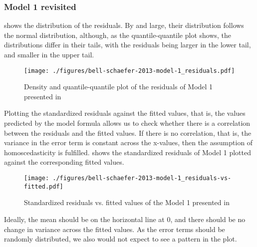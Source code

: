 \subsubsection{Model 1 revisited}
\label{sec:bell-schaefer-2013-model1-diagnostics:Model1}


 shows the distribution of the
residuals. By and large, their distribution follows the normal
distribution, although, as the quantile-quantile plot shows, the
distributions differ in their tails, with the residuals being larger
in the lower tail, and smaller in the upper tail. 

\begin{figure}[!htb]
  \centering
\texttt{[image: ./figures/bell-schaefer-2013-model-1\_residuals.pdf]}
  
  \caption{Density and quantile-quantile plot of the residuals of
    Model 1 presented in \citet{BellandSchaefer:2013}}
  \label{fig:residual-plots}
\end{figure}


Plotting the standardized
residuals against the fitted values, that is, the values predicted by the
model formula allows us to
check whether there is a correlation between the residuals and the
fitted values. If there is no correlation, that is, the variance in
the error term is constant across the x-values, then the assumption of
homoscedasticity is fulfilled. 
 shows the standardized
residuals of Model 1 plotted against the corresponding fitted values.
\begin{figure}[!htb]
  \centering
\texttt{[image: ./figures/bell-schaefer-2013-model-1\_residuals-vs-fitted.pdf]}
  
  \caption{Standardized residuals vs. fitted values of the 
    Model 1 presented in \citet{BellandSchaefer:2013}}
  \label{fig:residual-fitted-plots}
\end{figure}
Ideally, the mean should be on the horizontal line at 0, and there
should be no change in variance across the fitted values. As the error
terms should be randomly distributed, we also would not expect to see
a pattern in the plot. 


